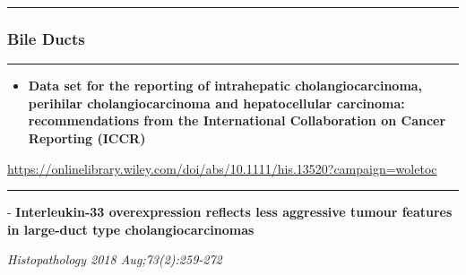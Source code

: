 \documentclass[]{article}
\providecommand{\tightlist}{%
  \setlength{\itemsep}{0pt}\setlength{\parskip}{0pt}}
\begin{document}
{}

{}

\begin{center}\rule{0.5\linewidth}{\linethickness}\end{center}

\hypertarget{bile-ducts}{%
\subsubsection{Bile Ducts}\label{bile-ducts}}

\begin{center}\rule{0.5\linewidth}{\linethickness}\end{center}

\begin{itemize}
\tightlist
\item
  \textbf{Data set for the reporting of intrahepatic cholangiocarcinoma,
  perihilar cholangiocarcinoma and hepatocellular carcinoma:
  recommendations from the International Collaboration on Cancer
  Reporting (ICCR)}
\end{itemize}

\url{https://onlinelibrary.wiley.com/doi/abs/10.1111/his.13520?campaign=woletoc}

\begin{center}\rule{0.5\linewidth}{\linethickness}\end{center}

 - \textbf{Interleukin-33 overexpression reflects less aggressive tumour
features in large-duct type cholangiocarcinomas}

\emph{Histopathology 2018 Aug;73(2):259-272}
\end{document}
